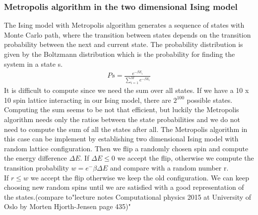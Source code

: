 \documentclass[10pt,a4paper]{article}
\begin{document}
\subsubsection{Metropolis algorithm in the two dimensional Ising model}
The Ising model with Metropolis algorithm generates a sequence of states with Monte Carlo path, where the transition between states depends on the transition probability between the next and current state. The probability distribution is given by the Boltzmann distribution which is the probability for finding the system in a state s.
\begin{align}
Ps =\frac{ e^{- \beta E_i}}{\sum_{i=1}^{M}e^{- \beta E_i}}
\end{align}
It is difficult to compute since we need the sum over all states. If we have a 10 x 10 spin lattice interacting in our Ising model, there are $2^{100}$ possible states. Computing the sum seems to be not that efficient, but luckily the Metropolis algorithm needs only the ratios between the state probabilities and we do not need to compute the sum of all the states after all. The Metropolis algorithm in this case can be implement by establishing two dimensional Ising model with random lattice configuration. Then we flip a randomly chosen spin and compute the energy difference $\Delta E$. If $\Delta E \leq 0$ we accept the flip, otherwise we compute the transition probability $w = e^-{\beta \Delta E}$ and compare with a random number r.\\If $r \leq w$ we accept the flip otherwise we keep the old configuration. We can keep choosing new random spins until we are satisfied with a good representation of the states.(compare to"lecture notes Computational physics 2015 at University of Oslo by Morten Hjorth-Jensen page 435)"   
\end{document}
